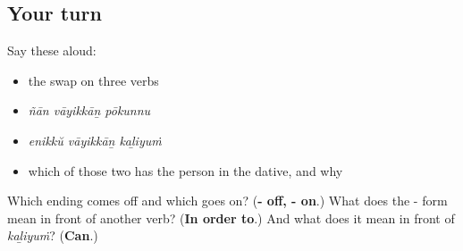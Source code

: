 \subsection*{Your turn}
Say these aloud:

\begin{itemize}
\raggedright
  \item the swap on three verbs
  \item \emph{ñān vāyikkāṉ pōkunnu}
  \item \emph{enikkŭ vāyikkāṉ kaḻiyuṁ}
  \item which of those two has the person in the dative, and why
\end{itemize}

\begin{tcolorbox}[breakable,colback=teal!4,colframe=teal!35!black,title={Before you move on}]
Which ending comes off and which goes on? (\textbf{- off, - on}.) What does the - form mean in front of another verb? (\textbf{In order to}.) And what does it mean in front of \emph{kaḻiyuṁ}? (\textbf{Can}.)
\end{tcolorbox}

